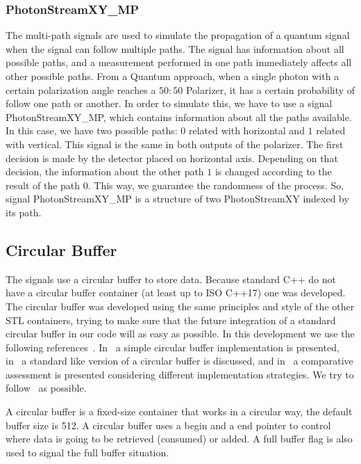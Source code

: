 \begin{refsection}
\subsubsection{PhotonStreamXY\_MP}
The multi-path signals are used to simulate the propagation of a quantum signal when the signal can follow multiple paths. The signal has information about all possible paths, and a measurement performed in one path immediately affects all other possible paths.
From a Quantum approach, when a single photon with a certain polarization angle reaches a $50:50$ Polarizer, it has a certain probability of follow one path or another. In order to simulate this, we have to use a signal PhotonStreamXY\_MP, which contains information about all the paths available. In this case, we have two possible paths: $0$ related with horizontal and $1$ related with vertical. This signal is the same in both outputs of the polarizer. The first decision is made by the detector placed on horizontal axis. Depending on that decision, the information about the other path $1$ is changed according to the result of the path $0$. This way, we guarantee the randomness of the process. So, signal PhotonStreamXY\_MP is a structure of two PhotonStreamXY indexed by its path.

\subsection{Circular Buffer}

The signals use a circular buffer to store data.
Because standard C++ do not have a circular buffer container (at least up to ISO C++17) one was developed.
The circular buffer was developed using the same principles and style of the other STL containers, trying to make sure that the future integration of a standard circular buffer in our code will as easy as possible.
In this development we use the following references~\cite{Johnston17, Gaspar18, Guntheroth18}.
In~\cite{Johnston17} a simple circular buffer implementation is presented, in~\cite{Gaspar18} a standard like version of a circular buffer is discussed, and in~\cite{Guntheroth18} a comparative assessment is presented considering different implementation strategies.
We try to follow~\cite{Gaspar18} as possible.

A circular buffer is a fixed-size container that works in a circular way, the default buffer size is 512.
A circular buffer uses a begin and a end pointer to control where data is going to be retrieved (consumed) or added.
A full buffer flag is also used to signal the full buffer situation.


\end{refsection}
